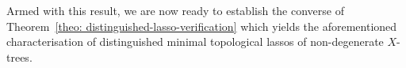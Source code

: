 %
%
%
%
Armed with this result, we are now ready to establish the converse of
Theorem~\ref{theo: distinguished-lasso-verification} which yields the
aforementioned characterisation of distinguished minimal topological lassos of
non-degenerate $X$-trees.

